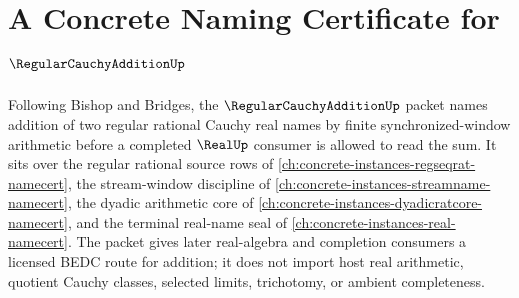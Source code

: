 \chapter{A Concrete Naming Certificate for $\RegularCauchyAdditionUp$}
\label{ch:concrete-instances-regular-cauchy-addition-namecert}

Following Bishop and Bridges, the $\RegularCauchyAdditionUp$ packet names addition of two regular rational Cauchy real names by finite synchronized-window arithmetic before a completed $\RealUp$ consumer is allowed to read the sum. It sits over the regular rational source rows of \autoref{ch:concrete-instances-regseqrat-namecert}, the stream-window discipline of \autoref{ch:concrete-instances-streamname-namecert}, the dyadic arithmetic core of \autoref{ch:concrete-instances-dyadicratcore-namecert}, and the terminal real-name seal of \autoref{ch:concrete-instances-real-namecert}. The packet gives later real-algebra and completion consumers a licensed BEDC route for addition; it does not import host real arithmetic, quotient Cauchy classes, selected limits, trichotomy, or ambient completeness.

